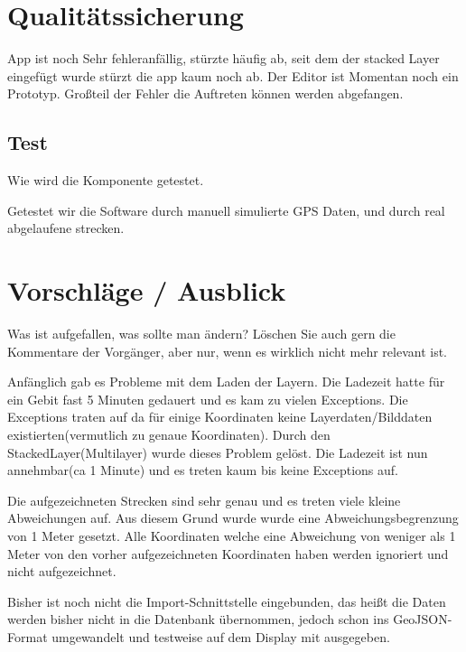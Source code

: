 \section{Qualitätssicherung}

App ist noch Sehr fehleranfällig, stürzte häufig ab, seit dem der stacked Layer eingefügt wurde stürzt die app kaum noch ab. Der Editor ist Momentan noch ein Prototyp.
Großteil der Fehler die Auftreten können werden abgefangen.

\subsection{Test}
Wie wird die Komponente getestet.

Getestet wir die Software durch manuell simulierte GPS Daten, und durch real abgelaufene strecken.

\section{Vorschläge / Ausblick}
Was ist aufgefallen, was sollte man ändern? Löschen Sie auch gern die Kommentare
der Vorgänger, aber nur, wenn es wirklich nicht mehr relevant ist.

Anfänglich gab es Probleme mit dem Laden der Layern. Die Ladezeit hatte für ein Gebit fast 5 Minuten gedauert und es kam zu vielen Exceptions. Die Exceptions traten auf da für einige Koordinaten keine Layerdaten/Bilddaten existierten(vermutlich zu genaue Koordinaten). Durch den StackedLayer(Multilayer) wurde dieses Problem gelöst. Die Ladezeit ist nun annehmbar(ca 1 Minute) und es treten kaum bis keine Exceptions auf.

Die aufgezeichneten Strecken sind sehr genau und es treten viele kleine Abweichungen auf. Aus diesem Grund wurde wurde eine Abweichungsbegrenzung von 1 Meter gesetzt. Alle Koordinaten welche eine Abweichung von weniger als 1 Meter von den vorher aufgezeichneten Koordinaten haben werden ignoriert und nicht aufgezeichnet.

Bisher ist noch nicht die Import-Schnittstelle eingebunden, das heißt die Daten werden bisher nicht in die Datenbank übernommen, jedoch schon ins GeoJSON-Format umgewandelt und testweise auf dem Display mit ausgegeben.

